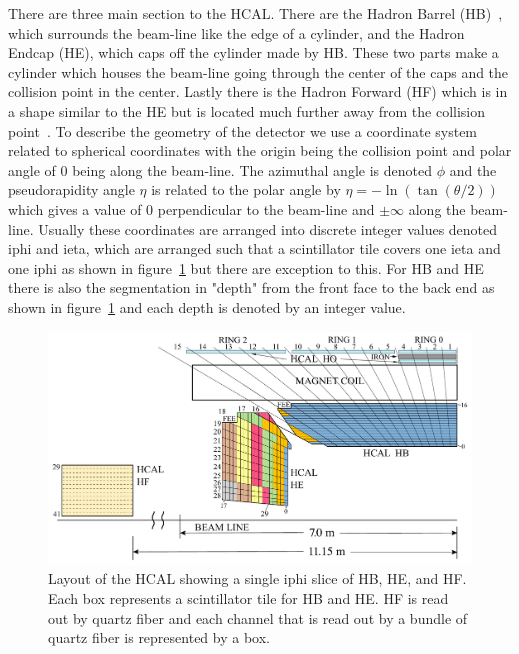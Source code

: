 There are three main section to the HCAL. There are the Hadron Barrel (HB)~\cite{HB}, which surrounds the beam-line like the edge of a cylinder, and the Hadron Endcap (HE), which caps off the cylinder made by HB. These two parts make a cylinder which houses the beam-line going through the center of the caps and the collision point in the center. Lastly there is the Hadron Forward (HF) which is in a shape similar to the HE but is located much further away from the collision point~\cite{HF}. To describe the geometry of the detector we use a coordinate system related to spherical coordinates with the origin being the collision point and polar angle of 0 being along the beam-line. The azimuthal angle is denoted $\phi$ and the pseudorapidity angle $\eta$ is related to the polar angle by $\eta = -\ln(\tan(\theta/2))$ which gives a value of 0 perpendicular to the beam-line and $\pm\infty$ along the beam-line. Usually these coordinates are arranged into discrete integer values denoted iphi and ieta, which are arranged such that a scintillator tile covers one ieta and one iphi as shown in figure~\ref{fig:Depth} but there are exception to this. For HB and HE there is also the segmentation in "depth" from the front face to the back end as shown in figure~\ref{fig:Depth} and each depth is denoted by an integer value. 


\begin{figure}
\centering
\includegraphics[width=\linewidth]{Figures/Depthsegmentation.pdf}
\caption{Layout of the HCAL showing a single iphi slice of HB, HE, and HF. Each box represents a scintillator tile for HB and HE. HF is read out by quartz fiber and each channel that is read out by a bundle of quartz fiber is represented by a box.}
\label{fig:Depth}
\end{figure}

